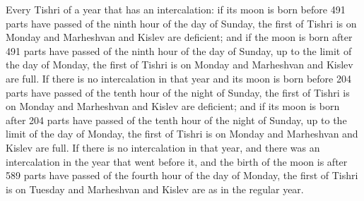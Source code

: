 \documentclass[11pt]{article}
\begin{document}
Every Tishri of a year that has an intercalation: if its moon is born before 491 parts have passed of the ninth hour of the day of Sunday, the first of Tishri is on Monday and Marheshvan and Kislev are deficient; and if the moon is born after 491 parts have passed of the ninth hour of the day of Sunday, up to the limit of the day of Monday, the first of Tishri is on Monday and Marheshvan and Kislev are full. If there is no intercalation in that year and its moon is born before 204 parts have passed of the tenth hour of the night of Sunday, the first of Tishri is on Monday and Marheshvan and Kislev are deficient; and if its moon is born after 204 parts have passed of the tenth hour of the night of Sunday, up to the limit of the day of Monday, the first of Tishri is on Monday and Marheshvan and Kislev are full. If there is no intercalation in that year, and there was an intercalation in the year that went before it, and the birth of the moon is after 589 parts have passed of the fourth hour of the day of Monday, the first of Tishri is on Tuesday and Marheshvan and Kislev are as in the regular year.
\end{document}
